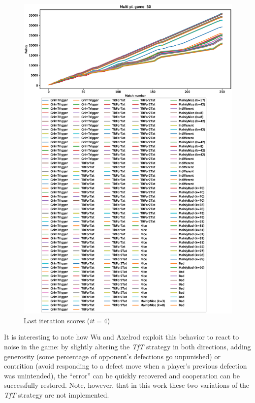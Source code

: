 \documentclass[journal,10pt,twoside]{IEEEtran}
\begin{document}
\begin{figure}[!ht]
    \centering
    \includegraphics[width=1\columnwidth]{../img/ripdmp-incr/ripdmp-scores-increasing-pop-50-r4}
    \caption{Last iteration scores ($it=4$)}
    \label{fig:incrLI}
\end{figure}

It is interesting to note how Wu and Axelrod \cite{IPDnoise} exploit this behavior to react to noise in the game: by slightly altering the \textit{TfT} strategy in both directions, adding generosity (some percentage of opponent's defections go unpunished) or contrition (avoid responding to a defect move when a player's previous defection was unintended), the ``error'' can be quickly recovered and cooperation can be successfully restored. Note, however, that in this work these two variations of the \textit{TfT} strategy are not implemented.
\end{document}
